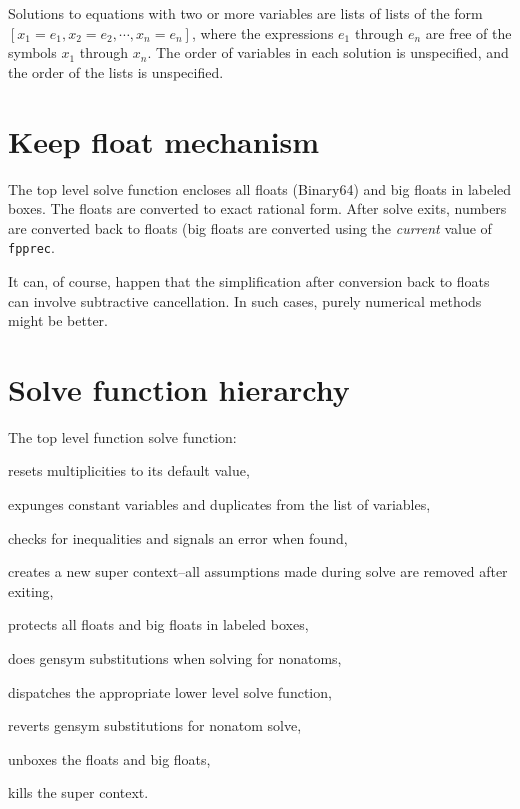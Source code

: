 \documentclass[]{scrartcl}
\newcommand{\fpprec}{\texttt{fpprec}}
\begin{document}








Solutions to equations with two or more variables are lists of lists of the form \([x_1 = e_1, x_2 = e_2,
\cdots, x_n = e_n] \), where the expressions \(e_1\) through \(e_n\) are free of the symbols \(x_1\)
through \(x_n \). The order of variables in each solution is unspecified, and the order of the lists is
unspecified.

\section{Keep float mechanism}

The top level solve function encloses all floats (Binary64) and big floats in labeled boxes. The floats are converted to exact rational form.
After solve exits, numbers are converted back to floats (big floats are converted using the \emph{current} value of \fpprec.

It can, of course, happen that the simplification after conversion back to floats can involve subtractive cancellation. In such cases, purely numerical methods might be better.

\section{Solve function hierarchy}

 The top level function solve function:
 \begin{alphalist}[]
   \item resets multiplicities to its default value,
   \item expunges constant variables and duplicates from the list of variables,
   \item checks for inequalities and signals an error when found,
   \item creates a new super context--all assumptions made during solve are removed after exiting,
   \item protects all floats and big floats in labeled boxes,
   \item does gensym substitutions when solving for nonatoms,
   \item dispatches the appropriate lower level solve function,
   \item reverts gensym substitutions for nonatom solve,
   \item unboxes the floats and big floats,
   \item kills the super context.
\end{alphalist}
\end{document}
